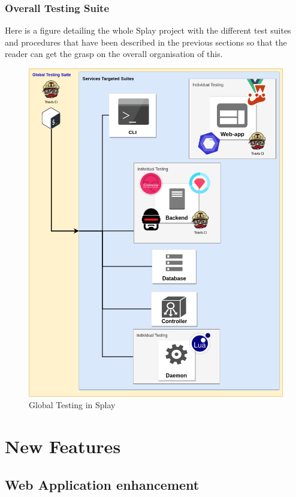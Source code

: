 \documentclass{eplmastersthesis}
\begin{document}
      \subsection{Overall Testing Suite}

        Here is a figure detailing the whole Splay project with the different
        test suites and procedures that have been described in the previous
        sections so that the reader can get the grasp on the overall
        organisation of this.

        \begin{figure}[H]
          \centering
          \includegraphics[scale=0.55]{figures/global_testing.png}
          \caption{\label{global_testing} Global Testing in Splay}
        \end{figure}

    \chapter{New Features}
      \section{Web Application enhancement}
\end{document}
